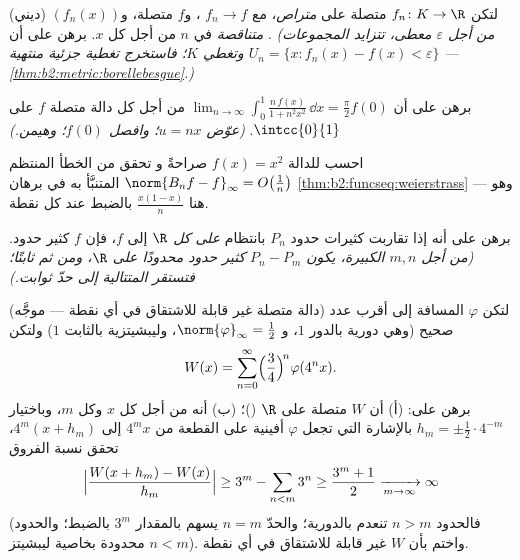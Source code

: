 \begin{exercise}[$\star\star$]\label{exo:b2:funcseq:5}
(ديني) لتكن $f_n \colon K \to \R$ متصلة على 
\emph{متراص}، مع $f_n \to f$ \emph{}، و$f$ متصلة،
و$(f_n(x))$ \emph{متناقصة} في $n$ من أجل كل $x$. برهن على أن
. \emph{(من أجل $\varepsilon$ معطى، تتزايد المجموعات
 $U_n = \{x : f_n(x) - f(x) < \varepsilon\}$ وتغطي
$K$؛ فاستخرج تغطية جزئية منتهية ---
\cref{thm:b2:metric:borellebesgue}.)}
\end{exercise}

\begin{exercise}[$\star\star$]\label{exo:b2:funcseq:6}
برهن على أن $\displaystyle\lim_{n\to\infty} \int_0^1
\frac{n\,f(x)}{1 + n^2x^2}\,\dd x = \frac{\pi}{2} f(0)$ من أجل كل
دالة متصلة $f$ على $\intcc{0}{1}$. \emph{(عوّض $u = nx$؛ وافصل
$f(0)$؛ وهيمن.)}
\end{exercise}

\begin{exercise}[$\star\star$]\label{exo:b2:funcseq:7}
احسب  للدالة $f(x) = x^2$ صراحةً و
تحقق من الخطأ المنتظم $\norm{B_n f - f}_\infty =
O\bigl(\frac1n\bigr)$ المتنبَّأ به في برهان
\cref{thm:b2:funcseq:weierstrass} --- وهو هنا $\frac{x(1 -
x)}{n}$ بالضبط عند كل نقطة.
\end{exercise}

\begin{exercise}[$\star\star$]\label{exo:b2:funcseq:8}
برهن على أنه إذا تقاربت كثيرات حدود $P_n$ بانتظام \emph{على كل
$\R$} إلى $f$، فإن $f$ كثير حدود. \emph{(من أجل $m, n$ الكبيرة،
يكون $P_n - P_m$ كثير حدود محدودًا على $\R$، ومن ثم ثابتًا؛ فتستقر
المتتالية إلى حدّ ثوابت.)}
\end{exercise}

\begin{exercise}[$\star\star\star$]\label{exo:b2:funcseq:9}
(دالة متصلة غير قابلة للاشتقاق في أي نقطة --- موجَّه) لتكن
$\varphi$ المسافة إلى أقرب عدد صحيح (وهي دورية بالدور $1$، و
$\norm{\varphi}_\infty = \frac12$، وليبشيتزية بالثابت $1$) ولتكن
\[
W(x) = \sum_{n=0}^{\infty} \Bigl(\frac{3}{4}\Bigr)^{\!n}
\varphi(4^n x) .
\]
برهن على: (أ) أن $W$ متصلة على $\R$ ()؛ (ب) أنه من أجل
كل $x$ وكل $m$، وباختيار $h_m = \pm\frac12\cdot 4^{-m}$
بالإشارة التي تجعل $\varphi$ أفينية على القطعة من $4^m x$
إلى $4^m(x + h_m)$، تحقق نسبة الفروق
\[
\Bigl|\frac{W(x + h_m) - W(x)}{h_m}\Bigr| \geq 3^m -
\sum_{n<m} 3^n \geq \frac{3^m + 1}{2} \xrightarrow[m\to\infty]{}
\infty
\]
(فالحدود $n > m$ تنعدم بالدورية؛ والحدّ $n = m$ يسهم
بالمقدار $3^m$ بالضبط؛ والحدود $n < m$ محدودة بخاصية ليبشيتز).
واختم بأن $W$ غير قابلة للاشتقاق في أي نقطة.
\end{exercise}

